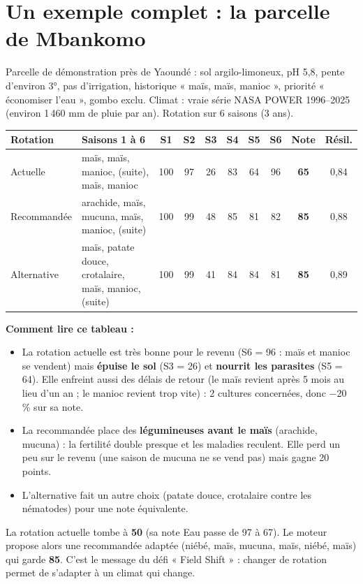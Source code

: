 \documentclass[11pt,a4paper]{article}
\begin{document}
\section{Un exemple complet : la parcelle de Mbankomo}

Parcelle de démonstration près de Yaoundé : sol argilo-limoneux, pH 5,8, pente d'environ 3°, pas d'irrigation,
historique « maïs, maïs, manioc », priorité « économiser l'eau », gombo exclu. Climat : vraie série NASA POWER
1996–2025 (environ 1\,460 mm de pluie par an). Rotation sur 6 saisons (3 ans).

\begin{center}
\small
\begin{tabularx}{\textwidth}{L{2.6cm}Ycccccccc}
\toprule
\textbf{Rotation} & \textbf{Saisons 1 à 6} & \textbf{S1} & \textbf{S2} & \textbf{S3} & \textbf{S4} & \textbf{S5} & \textbf{S6} & \textbf{Note} & \textbf{Résil.} \\
\midrule
Actuelle & maïs, maïs, manioc, (suite), maïs, manioc & 100 & 97 & 26 & 83 & 64 & 96 & \textbf{65} & 0,84 \\
Recommandée & arachide, maïs, mucuna, maïs, manioc, (suite) & 100 & 99 & 48 & 85 & 81 & 82 & \textbf{85} & 0,88 \\
Alternative & maïs, patate douce, crotalaire, maïs, manioc, (suite) & 100 & 99 & 41 & 84 & 84 & 81 & \textbf{85} & 0,89 \\
\bottomrule
\end{tabularx}
\end{center}

\textbf{Comment lire ce tableau :}
\begin{itemize}
\item La rotation actuelle est très bonne pour le revenu (S6 = 96 : maïs et manioc se vendent) mais \textbf{épuise
le sol} (S3 = 26) et \textbf{nourrit les parasites} (S5 = 64). Elle enfreint aussi des délais de retour (le maïs
revient après 5 mois au lieu d'un an ; le manioc revient trop vite) : 2 cultures concernées, donc −20 \% sur sa note.
\item La recommandée place des \textbf{légumineuses avant le maïs} (arachide, mucuna) : la fertilité double presque
et les maladies reculent. Elle perd un peu sur le revenu (une saison de mucuna ne se vend pas) mais gagne 20 points.
\item L'alternative fait un autre choix (patate douce, crotalaire contre les nématodes) pour une note équivalente.
\end{itemize}

\begin{exemple}
La rotation actuelle tombe à \textbf{50} (sa note Eau passe de 97 à 67). Le moteur propose alors une
recommandée adaptée (niébé, maïs, mucuna, maïs, niébé, maïs) qui garde \textbf{85}. C'est le message du défi
« Field Shift » : changer de rotation permet de s'adapter à un climat qui change.
\end{exemple}
\end{document}
